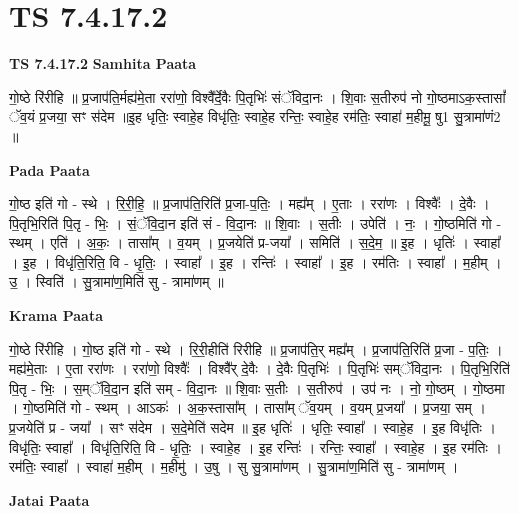 \documentclass[17pt]{extarticle}
\begin{document}
\section{ TS 7.4.17.2 }

\textbf{TS 7.4.17.2 } \newline
\textbf{Samhita Paata} \newline

गो॒ष्ठे रि॑रीहि ॥ प्र॒जाप॑ति॒र्मह्य॑मे॒ता ररा॑णो॒ विश्वै᳚र्दे॒वैः पि॒तृभिः॑ संॅविदा॒नः । शि॒वाः स॒तीरुप॑ नो गो॒ष्ठमाऽक॒स्तासां᳚ ॅव॒यं प्र॒जया॒ सꣳ स॑देम ॥इ॒ह धृतिः॒ स्वाहे॒ह विधृ॑तिः॒ स्वाहे॒ह रन्तिः॒ स्वाहे॒ह रम॑तिः॒ स्वाहा॑ म॒हीमू॒ षु1 सु॒त्रामा॑णं2 ॥ \newline

\textbf{Pada Paata} \newline

गो॒ष्ठ इति॑ गो - स्थे । रि॒री॒हि॒ ॥ प्र॒जाप॑ति॒रिति॑ प्र॒जा-प॒तिः॒ । मह्य᳚म् । ए॒ताः । ररा॑णः । विश्वैः᳚ । दे॒वैः । पि॒तृभि॒रिति॑ पि॒तृ - भिः॒ । सं॒ॅवि॒दा॒न इति॑ सं - वि॒दा॒नः ॥ शि॒वाः । स॒तीः । उपेति॑ । नः॒ । गो॒ष्ठमिति॑ गो - स्थम् । एति॑ । अ॒कः॒ । तासा᳚म् । व॒यम् । प्र॒जयेति॑ प्र-जया᳚ । समिति॑ । स॒दे॒म॒ ॥ इ॒ह । धृतिः॑ । स्वाहा᳚ । इ॒ह । विधृ॑ति॒रिति॒ वि - धृ॒तिः॒ । स्वाहा᳚ । इ॒ह । रन्तिः॑ । स्वाहा᳚ । इ॒ह । रम॑तिः । स्वाहा᳚ । म॒हीम् । उ॒ । स्विति॑ । सु॒त्रामा॑ण॒मिति॑ सु - त्रामा॑णम् ॥  \newline


\textbf{Krama Paata} \newline

गो॒ष्ठे रि॑रीहि । गो॒ष्ठ इति॑ गो - स्थे । रि॒री॒हीति॑ रिरीहि ॥ प्र॒जाप॑ति॒र् मह्य᳚म् । प्र॒जाप॑ति॒रिति॑ प्र॒जा - प॒तिः॒ । मह्य॑मे॒ताः । ए॒ता ररा॑णः । ररा॑णो॒ विश्वैः᳚ । विश्वै᳚र् दे॒वैः । दे॒वैः पि॒तृभिः॑ । पि॒तृभिः॑ सम्ॅविदा॒नः । पि॒तृभि॒रिति॑ पि॒तृ - भिः॒ । स॒म्ॅवि॒दा॒न इति॑ सम् - वि॒दा॒नः ॥ शि॒वाः स॒तीः । स॒तीरुप॑ । उप॑ नः । नो॒ गो॒ष्ठम् । गो॒ष्ठमा । गो॒ष्ठमिति॑ गो - स्थम् । आऽकः॑ । अ॒क॒स्तासा᳚म् । तासा᳚म् ॅव॒यम् । व॒यम् प्र॒जया᳚ । प्र॒जया॒ सम् । प्र॒जयेति॑ प्र - जया᳚ । सꣳ स॑देम । स॒दे॒मेति॑ सदेम ॥ इ॒ह धृतिः॑ । धृतिः॒ स्वाहा᳚ । स्वाहे॒ह । इ॒ह विधृ॑तिः । विधृ॑तिः॒ स्वाहा᳚ । विधृ॑ति॒रिति॒ वि - धृ॒तिः॒ । स्वाहे॒ह । इ॒ह रन्तिः॑ । रन्तिः॒ स्वाहा᳚ । स्वाहे॒ह । इ॒ह रम॑तिः । रम॑तिः॒ स्वाहा᳚ । स्वाहा॑ म॒हीम् । म॒हीमु॑ । उ॒षु । सु सु॒त्रामा॑णम् । सु॒त्रामा॑ण॒मिति॑ सु - त्रामा॑णम् । \newline

\textbf{Jatai Paata} \newline
\end{document}

